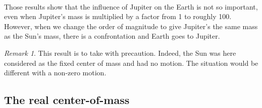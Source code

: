 \documentclass[a4paper, twoside, 11pt]{report}
\theoremstyle{theorem}
\theoremstyle{remark}
\newtheorem{remark}{Remark}[chapter]
\theoremstyle{exemple}
\begin{document}
                
                \paragraph{}Those results show that the influence of Jupiter on the Earth is not so important, even when Jupiter's mass is multiplied by a factor from 1 to roughly 100. However, when we change the order of magnitude to give Jupiter's the same mass as the Sun's mass, there is a confrontation and Earth goes to Jupiter.
                
                \begin{remark}
                	This result is to take with precaution. Indeed, the Sun was here considered as the fixed center of mass and had no motion. The situation would be different with a non-zero motion.
				\end{remark} 
                
                    
        \subsection{The real center-of-mass}
\end{document}
